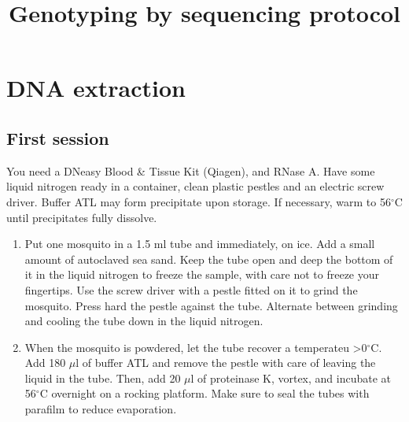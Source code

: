 \documentclass[a4paper,12pt]{article}
\title{Genotyping by sequencing protocol}
\begin{document}
\maketitle
\section{DNA extraction}
\subsection{First session}
You need a DNeasy Blood \& Tissue Kit (Qiagen), and RNase A. Have some liquid nitrogen ready in a container, clean plastic pestles and an electric screw driver. Buffer ATL may form precipitate upon storage. If necessary, warm to 56$^\circ$C until precipitates fully dissolve.
\begin{enumerate}
\item Put one mosquito in a 1.5 ml tube and immediately, on ice. Add a small amount of autoclaved sea sand. Keep the tube open and deep the bottom of it in the liquid nitrogen to freeze the sample, with care not to freeze your fingertips. Use the screw driver with a pestle fitted on it to grind the mosquito. Press hard the pestle against the tube. Alternate between grinding and cooling the tube down in the liquid nitrogen.
\item When the mosquito is powdered, let the tube recover a temperateu >0$^\circ$C. Add 180 $\mu$l of buffer ATL and remove the pestle with care of leaving the liquid in the tube. Then, add 20 $\mu$l of proteinase K, vortex, and incubate at 56$^\circ$C overnight on a rocking platform. Make sure to seal the tubes with parafilm to reduce evaporation.
\end{enumerate}
\end{document}
